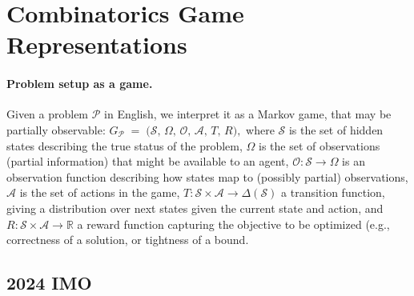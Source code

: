 \section{Combinatorics Game Representations}
\label{appendix:F}

\paragraph{Problem setup as a game.}
Given a problem \(\mathcal{P}\) in English, we interpret it as a Markov game, that may be partially observable:
$G_{\mathcal{P}} \;=\; \bigl(\mathcal{S},\, \Omega,\,\mathcal{O},\, \mathcal{A},\, T,\, R\bigr),$
where $\mathcal{S}$ is the set of hidden states describing the true status of the problem,
$\Omega$ is the set of observations (partial information) that might be available to an agent,
$\mathcal{O}:\mathcal{S}\to\Omega$ is an observation function describing how states map to (possibly partial) observations,
$\mathcal{A}$ is the set of actions in the game,
$T:\mathcal{S}\times \mathcal{A}\to \Delta(\mathcal{S})$ a transition function, giving a distribution over next states given the current state and action, and $R:\mathcal{S}\times \mathcal{A}\to \mathbb{R}$ a reward function capturing the objective to be optimized (e.g., correctness of a solution, or tightness of a bound.



\subsection*{2024 IMO}
\label{appendix:F_2024_IMO}

